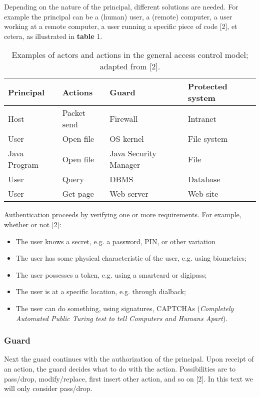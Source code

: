 Depending on the nature of the principal, different solutions are needed. For example the principal can be a (human) user, a (remote) computer, a user working at a remote computer, a user running a specific piece of code [2], et cetera, as illustrated in \textbf{table} 1.


\begin{table}[h]
	\caption{Examples of actors and actions in the general access control model; adapted from [2].}
	\label{tab:access-control:examples}
	\begin{tabular}{p{75px} | p{75px} | p{75px} | p{75px} }
		\textbf{Principal} & \textbf{Actions} 	& \textbf{Guard} & \textbf{Protected system} \\
		\hline
		Host 					& Packet send & Firewall							& Intranet 		\\
		User 					& Open file 	& OS kernel							& File system \\
		Java Program 	& Open file 	& Java Security Manager	& File 				\\
		User 					& Query 			& DBMS									& Database 		\\
		User 					& Get page 		& Web server						& Web site 		\\
		\hline
	\end{tabular}
\end{table}




Authentication proceeds by verifying one or more requirements. For example, whether or not [2]:
\begin{itemize}
	\item The user knows a secret, e.g. a password, PIN, or other variation
	\item The user has some physical characteristic of the user, e.g. using biometrics;
	\item The user possesses a token, e.g. using a smartcard or digipass;
	\item The user is at a specific location, e.g. through dialback;
	\item The user can do something, using signatures, CAPTCHAs (\emph{Completely Automated Public Turing test to tell Computers and Humans Apart}).
\end{itemize}



\subsubsection{Guard}

Next the guard continues with the authorization of the principal. Upon receipt of an action, the guard decides what to do with the action. Possibilities are to pass/drop, modify/replace, first insert other action, and so on [2]. In this text we will only consider pass/drop.


